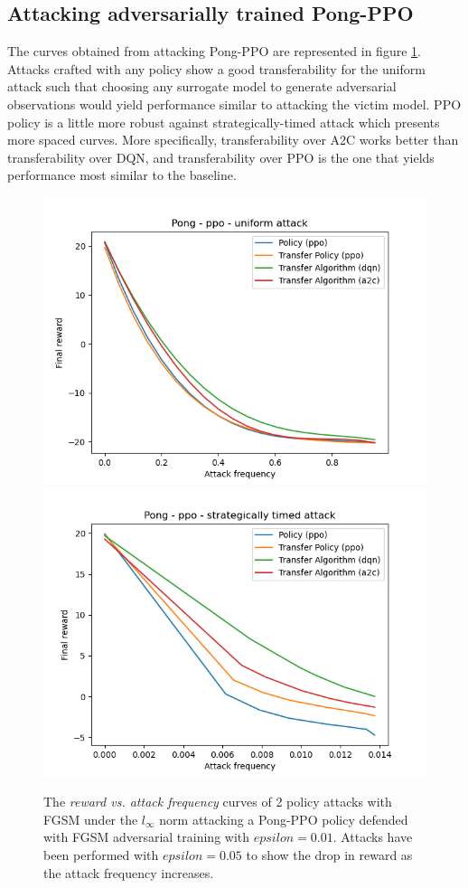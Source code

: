 \subsection{Attacking adversarially trained Pong-PPO}
The curves obtained from attacking Pong-PPO are represented in figure \ref{figure:pong-ppo-def}. Attacks crafted with any policy show a good transferability for the uniform attack such that choosing any surrogate model to generate adversarial observations would yield performance similar to attacking the victim model. PPO policy is a little more robust against strategically-timed attack which presents more spaced curves. More specifically, transferability over A2C works better than transferability over DQN, and transferability over PPO is the one that yields performance most similar to the baseline.

\begin{figure}
  \centering
    {\includegraphics[width=0.49\linewidth]{images/exp2/ppo-pong-uniform.png}}
    {\includegraphics[width=0.49\linewidth]{images/exp2/ppo-pong-strategically_timed.png}}
  \caption{The {\it reward vs. attack frequency} curves of 2 policy attacks with FGSM under the \(l_\infty\) norm attacking a Pong-PPO policy defended with FGSM adversarial training with \(epsilon=0.01\). Attacks have been performed with \(epsilon=0.05\) to show the drop in reward as the attack frequency increases.}
  \label{figure:pong-ppo-def}
\end{figure}

